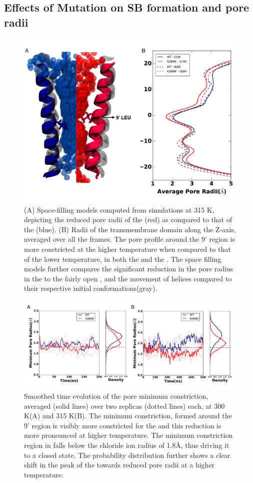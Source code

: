 \documentclass[9pt,twocolumn,twoside,lineno]{pnas-new}
\begin{document}
\subsection*{Effects of Mutation on SB formation and pore radii}

\begin{figure}
\begin{center}
\includegraphics[width = .5\textwidth]{figures/pore_radd_fill.pdf}
\end{center}
\caption{(A) Space-filling models computed from simulations at 315 K, depicting the reduced pore radii of the \MT(red) as compared to that of the \WT(blue). (B) Radii of the transmembrane domain along the Z-axis, averaged over all the frames. The pore profile around the 9' region is more constricted at the higher temperature when compared to that of the lower temperature, in both the \WT and the \MT. The space filling models further compares the significant reduction in the pore radius in the \MT to the fairly open \WT, and the movement of helices compared to their respective initial conformations(gray).}
\label{fig:pore-profile}
\end{figure}

\begin{figure}
\begin{center}
\includegraphics[width = .5\textwidth]{figures/min_pore_radd.pdf}
\end{center}
\caption{Smoothed time evolution of the pore minimum constriction, averaged (solid lines) over two replicas (dotted lines) each, at 300 K(A) and 315 K(B). The minimum constriction, formed around the 9' region is visibly more constricted for the \MTs and this reduction is more pronounced at higher temperature. The minimum constriction region in \MT falls below the chloride ion radius of 1.8\AA, thus driving it to a closed state. The probability distribution further shows a clear shift in the peak of the \MTs towards reduced pore radii at a higher temperature.}
\label{fig:pore-evolution}
\end{figure}
\end{document}
